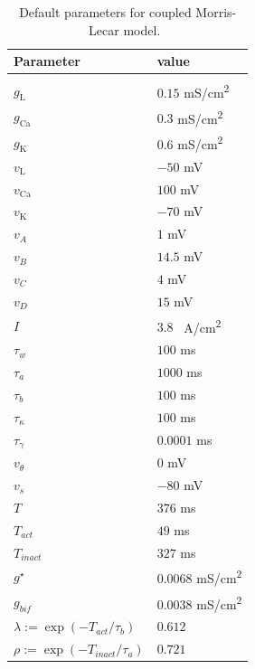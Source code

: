 \documentclass[utf8]{frontiers_suppmat} %
\renewcommand{\k}{\mathrm{K}}
\newcommand{\ca}{\mathrm{Ca}}
\newcommand{\leak}{\mathrm{L}}
\begin{document}
\begin{table}[h]
	\caption{Default parameters for coupled Morris-Lecar model.~\label{tab:pars}}
	\centering
	\begin{tabular}{ll}
		Parameter                        & value                 \\
		\hline
		                                 &                       \\
		$g_{\leak}$                      & $0.15$ \si{mS/cm^2}   \\
		$g_{\ca}$                        & $0.3$ \si{mS/cm^2}    \\
		$g_{\k}$                         & $0.6$ \si{mS/cm^2}    \\
		$v_{\leak}$                      & $-50$ \si{mV}         \\
		$v_{\ca}$                        & $100$ \si{mV}         \\
		$v_{\k}$                         & $-70$ \si{mV}         \\
		$v_{A}$                          & $1$ \si{mV}           \\
		$v_{B}$                          & $14.5$ \si{mV}        \\
		$v_{C}$                          & $4$ \si{mV}           \\
		$v_{D}$                          & $15$ \si{mV}          \\
		$I$                              & $3.8$ \si{\mu A/cm^2} \\
		$\tau_w$                         & $100$ \si{ms}         \\
		$\tau_a$                         & $1000$ \si{ms}        \\
		$\tau_b$                         & $100$ \si{ms}         \\
		$\tau_\kappa$                    & $100$ \si{ms}         \\
		$\tau_\gamma$                    & $0.0001$ \si{ms}      \\
		$v_{\theta}$                     & $0$ \si{mV}           \\
		$v_{s}$                          & $-80$ \si{mV}         \\
		$T$                              & $376$ \si{ms}         \\
		$T_{act}$                        & $49$ \si{ms}          \\
		$T_{inact}$                      & $327$ \si{ms}         \\
		$g^{\star}$                      & $0.0068$ \si{mS/cm^2} \\
		$g_{bif}$                        & $0.0038$ \si{mS/cm^2} \\
		$\lambda:=\exp(-T_{act}/\tau_b)$ & $0.612$               \\
		$\rho:=\exp(-T_{inact}/\tau_a)$  & $0.721$               \\
	\end{tabular}
\end{table}
\end{document}
